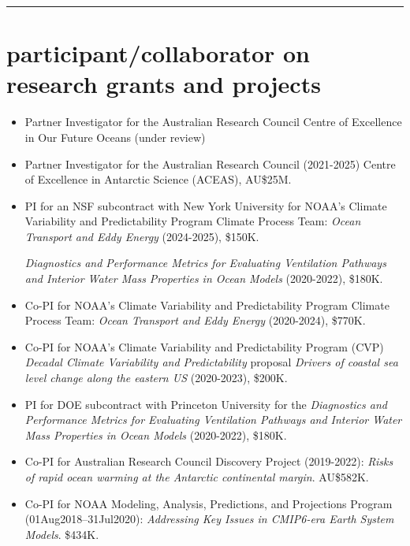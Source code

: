 \documentclass{article}
\begin{document}



\noindent\rule{\textwidth}{1pt}
\vspace{-1cm}
\section*{\sc \color{Maroon}  participant/collaborator on research grants and projects}
\vspace{-.3cm}

\begin{itemize}[leftmargin=*]

\item Partner Investigator for the Australian Research Council Centre of Excellence in Our Future Oceans (under review)

\item Partner Investigator for the Australian Research Council (2021-2025) Centre of Excellence in Antarctic Science (ACEAS), AU\$25M.

\item PI for an NSF subcontract with New York  University for NOAA's Climate Variability and Predictability Program Climate Process Team: {\it Ocean Transport and Eddy Energy} (2024-2025), \$150K.

{\it Diagnostics and Performance Metrics for Evaluating Ventilation Pathways and Interior Water Mass Properties in Ocean Models} (2020-2022), \$180K. 
 
\item Co-PI for NOAA's Climate Variability and Predictability Program Climate Process Team: {\it Ocean Transport and Eddy Energy} (2020-2024), \$770K.

\item Co-PI for NOAA's Climate Variability and Predictability Program (CVP) {\it Decadal Climate Variability and Predictability} proposal {\it Drivers of coastal sea level change along the eastern US} (2020-2023), \$200K.  

\item PI for DOE subcontract with Princeton University for the {\it Diagnostics and Performance Metrics for Evaluating Ventilation Pathways and Interior Water Mass Properties in Ocean Models} (2020-2022), \$180K. 

\item Co-PI for Australian Research Council Discovery Project (2019-2022): {\it Risks of rapid ocean warming at the Antarctic continental margin}. AU\$582K.

\item Co-PI for NOAA Modeling, Analysis, Predictions, and Projections Program (01Aug2018--31Jul2020): {\it Addressing Key Issues in CMIP6-era Earth System Models}. \$434K.
    

\end{itemize}
\end{document}
